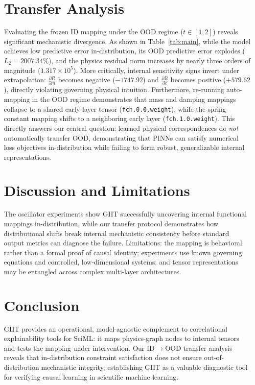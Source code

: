 \documentclass{article}
\begin{document}
\section{Transfer Analysis}
\label{sec:transfer}
Evaluating the frozen ID mapping under the OOD regime ($t \in [1, 2]$) reveals significant mechanistic divergence.
As shown in Table~\ref{tab:main}, while the model achieves low predictive error in-distribution, its OOD predictive error explodes ($L_2 = 2007.34\%$), and the physics residual norm increases by nearly three orders of magnitude ($1.317\times10^5$).
More critically, internal sensitivity signs invert under extrapolation: $\frac{\partial R}{\partial m}$ becomes negative ($-1747.92$) and $\frac{\partial R}{\partial c}$ becomes positive ($+579.62$), directly violating governing physical intuition. 
Furthermore, re-running auto-mapping in the OOD regime demonstrates that mass and damping mappings collapse to a shared early-layer tensor (\texttt{fch.0.0.weight}), while the spring-constant mapping shifts to a neighboring early layer (\texttt{fch.1.0.weight}).
This directly answers our central question: learned physical correspondences do \emph{not} automatically transfer OOD, demonstrating that PINNs can satisfy numerical loss objectives in-distribution while failing to form robust, generalizable internal representations.

\section{Discussion and Limitations}
\label{sec:limitations}
The oscillator experiments show GIIT successfully uncovering internal functional mappings in-distribution,
while our transfer protocol demonstrates how distributional shifts break internal mechanistic consistency before standard output metrics can diagnose the failure.
Limitations: the mapping is behavioral rather than a formal proof of causal identity; experiments use known governing equations and controlled, low-dimensional systems; and tensor representations may be entangled across complex multi-layer architectures.

\section{Conclusion}
\label{sec:conclusion}
GIIT provides an operational, model-agnostic complement to correlational
explainability tools for SciML: it maps physics-graph nodes to internal
tensors and tests the mapping under intervention. Our ID$\to$OOD transfer analysis reveals that
in-distribution constraint satisfaction does not ensure out-of-distribution mechanistic integrity,
establishing GIIT as a valuable diagnostic tool for verifying causal learning in scientific machine learning.
\end{document}
